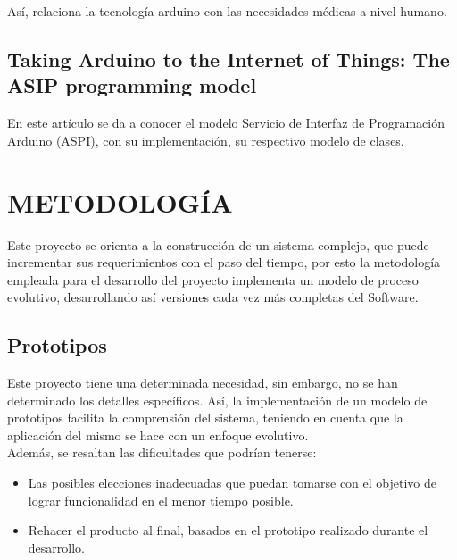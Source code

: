 \documentclass[letterpaper, 10 pt, conference]{ieeeconf}  %
\begin{document}
As\'i, relaciona la tecnolog\'ia arduino con las necesidades m\'edicas a nivel humano.


\subsection{Taking Arduino to the Internet of Things: The ASIP programming model \cite{c6}}

En este art\'iculo se da a conocer el modelo Servicio de Interfaz de Programaci\'on Arduino (ASPI), con su implementaci\'on, su respectivo modelo de clases.





\section{METODOLOG\'IA}

Este proyecto se orienta a la construcci\'on de un sistema complejo, que puede incrementar sus requerimientos con el paso del tiempo, por esto la metodolog\'ia empleada para el desarrollo del proyecto implementa un modelo de proceso evolutivo, desarrollando as\'i versiones cada vez m\'as completas del Software.\\



\subsection{Prototipos}

Este proyecto tiene una determinada necesidad, sin embargo, no se han determinado los detalles espec\'ificos. As\'i, la implementaci\'on de un modelo de prototipos facilita la comprensi\'on del sistema, teniendo en cuenta que la aplicaci\'on del mismo se hace con un enfoque evolutivo.\\

Adem\'as, se resaltan las dificultades que podr\'ian tenerse:

\begin{itemize}
    \item Las posibles elecciones inadecuadas que puedan tomarse con el objetivo de lograr funcionalidad en el menor tiempo posible.
    \item Rehacer el producto al final, basados en el prototipo realizado durante el desarrollo.
\end{itemize}
\end{document}
